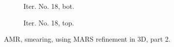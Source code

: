 \documentclass[a4paper,12pt]{amsart}
\numberwithin{equation}{section}
\begin{document}
\begin{figure}[h!]
\begin{subfigure}[t]{0.49\textwidth}
    \caption{Iter. No. 18, bot.}
\end{subfigure}
	\hfill
\begin{subfigure}[t]{0.49\textwidth}
    \caption{Iter. No. 18, top.}
\end{subfigure}

\caption{AMR, smearing, using MARS refinement in 3D, part 2.}
\label{fig:amr_trans3D_pv_mars_topbot_part2}
\end{figure}
\end{document}
